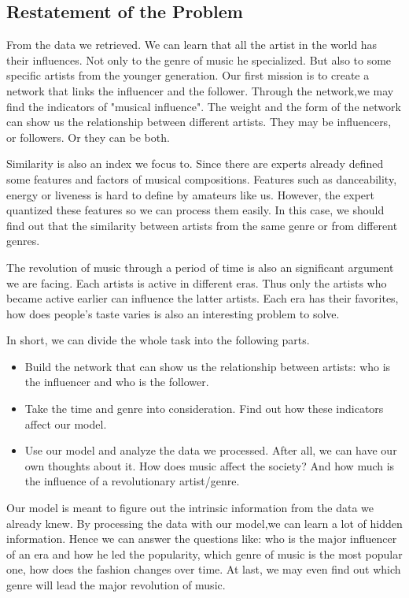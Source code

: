 \documentclass[12pt]{article}
\begin{document}
\subsection{Restatement of the Problem}\quad\;
From the data we retrieved.\cite{1} We can learn that all the artist in the world has their influences. Not only to the genre of music he specialized. But also to some specific artists from the younger generation. Our first mission is to create a network that links the influencer and the follower. Through the network,we may find the indicators of "musical influence". The weight and the form of the network can show us the relationship between different artists. They may be influencers, or followers. Or they can be both.\par
Similarity is also an index we focus to. Since there are experts already defined some features and factors of musical compositions. Features such as danceability, energy or liveness is hard to define by amateurs like us. However, the expert quantized these features so we can process them easily. In this case, we should find out that the similarity between artists from the same genre or from different genres.\par
The revolution of music through a period of time is also an significant argument we are facing. Each artists is active in different eras. Thus only the artists who became active earlier can influence the latter artists. Each era has their favorites, how does people's taste varies is also an interesting problem to solve.\par
In short, we can divide the whole task into the following parts.
\begin{itemize}
\item Build the network that can show us the relationship between artists: who is the influencer and who is the follower.
\item Take the time and genre into consideration. Find out how these indicators affect our model.
\item Use our model and analyze the data we processed. After all, we can have our own thoughts about it. How does music affect the society? And how much is the influence of a revolutionary artist/genre.
\end{itemize}\quad\;
Our model is meant to figure out the intrinsic information from the data we already knew. By processing the data with our model,we can learn a lot of hidden information. Hence we can answer the questions like: who is the major influencer of an era and how he led the popularity, which genre of music is the most popular one, how does the fashion changes over time. At last, we may even find out which genre will lead the major revolution of music.
\end{document}
